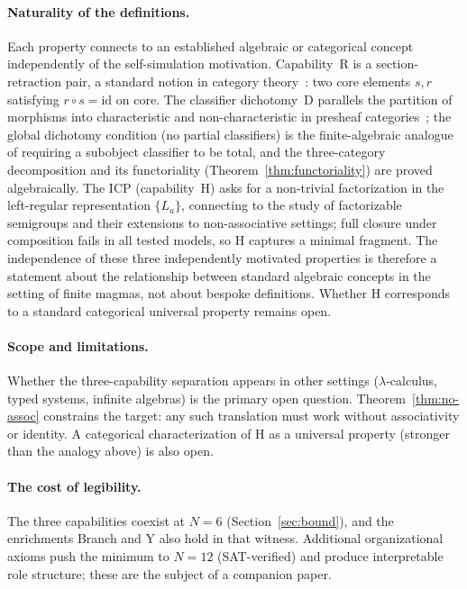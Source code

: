 \documentclass[a4paper,UKenglish,cleveref,autoref,thm-restate]{lipics-v2021}
\begin{document}
\paragraph{Naturality of the definitions.}
Each property connects to an established algebraic or categorical concept independently of the self-simulation motivation. Capability~R is a section-retraction pair, a standard notion in category theory~\cite{maclane71}: two core elements $s, r$ satisfying $r \circ s = \mathrm{id}$ on core. The classifier dichotomy~D parallels the partition of morphisms into characteristic and non-characteristic in presheaf categories~\cite{johnstone02}; the global dichotomy condition (no partial classifiers) is the finite-algebraic analogue of requiring a subobject classifier to be total, and the three-category decomposition and its functoriality (Theorem~\ref{thm:functoriality}) are proved algebraically. The ICP (capability~H) asks for a non-trivial factorization in the left-regular representation $\{L_a\}$, connecting to the study of factorizable semigroups and their extensions to non-associative settings; full closure under composition fails in all tested models, so H captures a minimal fragment. The independence of these three independently motivated properties is therefore a statement about the relationship between standard algebraic concepts in the setting of finite magmas, not about bespoke definitions. Whether H corresponds to a standard categorical universal property remains open.

\paragraph{Scope and limitations.}
Whether the three-capability separation appears in other settings ($\lambda$-calculus, typed systems, infinite algebras) is the primary open question. Theorem~\ref{thm:no-assoc} constrains the target: any such translation must work without associativity or identity. A categorical characterization of H as a universal property (stronger than the analogy above) is also open.

\paragraph{The cost of legibility.}
The three capabilities coexist at $N\!=\!6$ (Section~\ref{sec:bound}), and the enrichments Branch and Y also hold in that witness. Additional organizational axioms push the minimum to $N\!=\!12$ (SAT-verified) and produce interpretable role structure; these are the subject of a companion paper.
\end{document}

